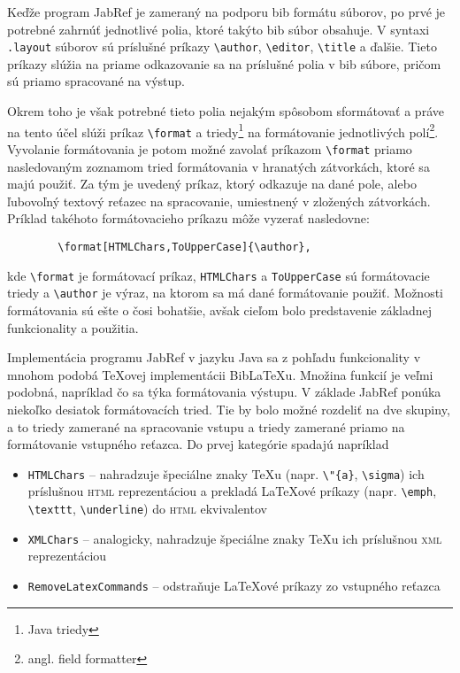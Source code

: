 \documentclass{fithesis3}
\begin{document}
	Keďže program JabRef je zameraný na podporu bib formátu súborov, po prvé je potrebné zahrnúť jednotlivé polia, ktoré takýto bib súbor obsahuje. V syntaxi \texttt{.layout} súborov sú príslušné príkazy \verb|\author|, \verb|\editor|, \verb|\title| a ďalšie. Tieto príkazy slúžia na priame odkazovanie sa na príslušné polia v bib súbore, pričom sú priamo spracované na výstup.
	
	Okrem toho je však potrebné tieto polia nejakým spôsobom sformátovať a práve na tento účel slúži príkaz \verb|\format| a triedy\footnote{Java triedy} na formátovanie jednotlivých polí\footnote{angl. field formatter}. Vyvolanie formátovania je potom možné zavolať príkazom \verb|\format| priamo nasledovaným zoznamom tried formátovania v hranatých zátvorkách, ktoré sa majú použiť. Za tým je uvedený príkaz, ktorý odkazuje na dané pole, alebo ľubovoľný textový reťazec na spracovanie, umiestnený v zložených zátvorkách. Príklad takéhoto formátovacieho príkazu môže vyzerať nasledovne:

	\begin{verbatim}
		\format[HTMLChars,ToUpperCase]{\author},
	\end{verbatim}
	
	\noindent kde \verb|\format| je formátovací príkaz, \texttt{HTMLChars} a \texttt{ToUpperCase} sú formátovacie triedy a \verb|\author| je výraz, na ktorom sa má dané formátovanie použiť. Možnosti formátovania sú ešte o čosi bohatšie, avšak cieľom bolo predstavenie základnej funkcionality a použitia.
	
	
	Implementácia programu JabRef v jazyku Java sa z pohľadu funkcionality v mnohom podobá \TeX ovej implementácii BibLaTeXu. Množina funkcií je veľmi podobná, napríklad čo sa týka formátovania výstupu. V základe JabRef ponúka niekoľko desiatok formátovacích tried. Tie by bolo možné rozdeliť na dve skupiny, a to triedy zamerané na spracovanie vstupu a triedy zamerané priamo na formátovanie vstupného reťazca. Do prvej kategórie spadajú napríklad
	
	\begin{itemize}
	\item \texttt{HTMLChars} -- nahradzuje špeciálne znaky \TeX u (napr. \verb|\"{a}|, \verb|\sigma|) ich príslušnou \textsc{html} reprezentáciou a prekladá \LaTeX ové príkazy (napr. \verb|\emph|, \verb|\texttt|, \verb|\underline|) do \textsc{html} ekvivalentov
	\item \texttt{XMLChars} -- analogicky, nahradzuje špeciálne znaky \TeX u ich príslušnou \textsc{xml} reprezentáciou
	\item \texttt{RemoveLatexCommands} -- odstraňuje \LaTeX ové príkazy zo vstupného reťazca
	\end{itemize}
	
\end{document}
